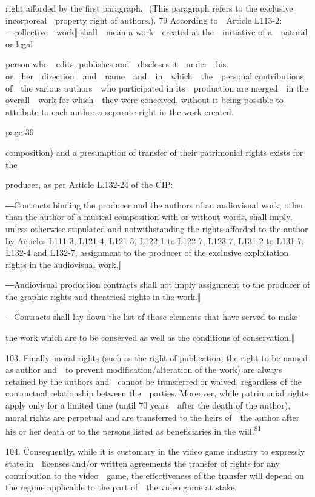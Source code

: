 \documentclass[
]{article}
\begin{document}
{right afforded by the first paragraph.}{‖ (}{This paragraph refers to
the }{exclusive incorporeal~~property right }{of authors.). }{79
}{According to~~Article L113-2: }{―}{c}{ollective~~work‖ shall~~}{mean a
work~~created at the~~initiative of a~~natural or legal}

{person who~~edits, publishes and~~discloses it~~under~~his
or~~her~~direction~~and~~name~~and~~in~~which~~the~~personal
contributions of~~the various authors~~who participated in
its~~production are merged~~in the overall~~work for which~~they were
conceived, without it being possible to attribute to each author a
separate right in the work created.}

{page 39}

{composition) and a presumption of transfer of their patrimonial rights
exists for the}

{producer, as per Article L.132-24 of the }{CIP}{:}

{―Contracts binding the producer and the authors of an audiovisual work,
other }{than the author of a musical composition with or without words,
shall imply, unless otherwise stipulated and notwithstanding the rights
afforded to the author by Articles L111-3, L121-4, L121-5, L122-1 to
L122-7, L123-7, L131-2 to L131-7, L132-4 and L132-7, assignment to the
producer of the exclusive exploi}{tation rights in the audiovisual
work.‖}

{―Audiovisual production contracts shall not imply assignment to the
producer of the graphic rights and theatrical rights in the work.‖}

{―Contracts shall lay down the list of those elements that have served
to make}

{t}{he work which are to be conserved as well as the conditions of
conservation.‖}

{103. }{Finally, moral rights (such as the right of publication, the
right to be named as author and~~to prevent modification/alteration of
the work) are always retained by the authors and~~cannot be transferred
or waived, regardless of the contractual relationship between
the~~parties. Moreover, while patrimonial rights apply only for a
limited time (until 70 years~~after the death of the author), moral
rights are perpetual and are transferred to the heirs of~~the author
after his or her death or to the persons listed as beneficiaries in the
will.}\textsuperscript{{81}}

{104. }{Consequently, while it is customary in the video game industry
to expressly state in~~licenses and/or written agreements the transfer
of rights for any contribution to the video~~game, the effectiveness of
the transfer will depend on the regime applicable to the part of~~the
video game at stake.}
\end{document}
